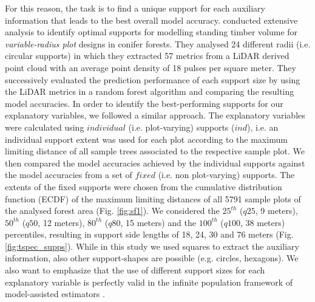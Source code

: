 For this reason, the task is to find a unique support for each auxiliary information that leads to the best overall model accuracy. \citet{deo2016} conducted extensive analysis to identify optimal supports for modelling standing timber volume for \textit{variable-radius plot} designs in conifer forests. They analysed 24 different radii (i.e. circular supports) in which they extracted 57 metrics from a LiDAR derived point cloud with an average point density of 18 pulses per square meter. They successively evaluated the prediction performance of each support size by using the LiDAR metrics in a random forest algorithm and comparing the resulting model accuracies. In order to identify the best-performing supports for our explanatory variables, we followed a similar approach. The explanatory variables were calculated using $individual$ (i.e. plot-varying) supports ($ind$), i.e. an individual support extent was used for each plot according to the maximum limiting distance of all sample trees associated to the respective sample plot. We then compared the model accuracies achieved by the individual supports against the model accuracies from a set of $fixed$ (i.e. non plot-varying) supports. The extents of the fixed supports were chosen from the cumulative distribution function (ECDF) of the maximum limiting distances of all 5791 sample plots of the analysed forest area (Fig. \ref{fig:sf1}). We considered the $25^{th}$ ($q25$, 9 meters), $50^{th}$ ($q50$, 12 meters), $80^{th}$ ($q80$, 15 meters) and the $100^{th}$ ($q100$, 38 meters) percentiles, resulting in support side lengths of 18, 24, 30 and 76 meters (Fig. \ref{fig:tspec_supps}). While in this study we used squares to extract the auxiliary information, also other support-shapes are possible (e.g. circles, hexagons). We also want to emphasize that the use of different support sizes for each explanatory variable is perfectly valid in the infinite population framework of model-assisted estimators \citep{mandallaz2013c, mandallaz2013a}.

